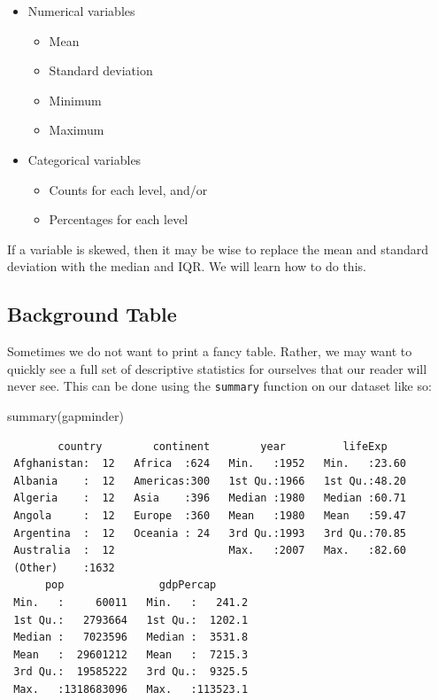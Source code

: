 \documentclass[
]{book}
\makeatletter
\newenvironment{Shaded}{\begin{snugshade}}{\end{snugshade}}
\newcommand{\FunctionTok}[1]{\textcolor[rgb]{0,0,0}{#1}}
\newcommand{\NormalTok}[1]{#1}
\providecommand{\tightlist}{%
  \setlength{\itemsep}{0pt}\setlength{\parskip}{0pt}}
\newenvironment{kframe}{%
\medskip{}
\setlength{\fboxsep}{.8em}
 \def\at@end@of@kframe{}%
 \ifinner\ifhmode%
  \def\at@end@of@kframe{\end{minipage}}%
  \begin{minipage}{\columnwidth}%
 \fi\fi%
 \def\FrameCommand##1{\hskip\@totalleftmargin \hskip-\fboxsep
 \colorbox{shadecolor}{##1}\hskip-\fboxsep
     \hskip-\linewidth \hskip-\@totalleftmargin \hskip\columnwidth}%
 \MakeFramed {\advance\hsize-\width
   \@totalleftmargin\z@ \linewidth\hsize
   \@setminipage}}%
 {\par\unskip\endMakeFramed%
 \at@end@of@kframe}
\renewenvironment{Shaded}{\begin{kframe}}{\end{kframe}}
\makeatother
\begin{document}
\begin{itemize}
\tightlist
\item
  Numerical variables

  \begin{itemize}
  \tightlist
  \item
    Mean
  \item
    Standard deviation
  \item
    Minimum
  \item
    Maximum
  \end{itemize}
\item
  Categorical variables

  \begin{itemize}
  \tightlist
  \item
    Counts for each level, and/or
  \item
    Percentages for each level
  \end{itemize}
\end{itemize}

If a variable is skewed, then it may be wise to replace the mean and standard deviation with the median and IQR. We will learn how to do this.

\hypertarget{background-table}{%
\subsection{Background Table}\label{background-table}}

Sometimes we do not want to print a fancy table. Rather, we may want to quickly see a full set of descriptive statistics for ourselves that our reader will never see. This can be done using the \texttt{summary} function on our dataset like so:

\begin{Shaded}
\begin{Highlighting}[]
\FunctionTok{summary}\NormalTok{(gapminder)}
\end{Highlighting}
\end{Shaded}

\begin{verbatim}
        country        continent        year         lifeExp     
 Afghanistan:  12   Africa  :624   Min.   :1952   Min.   :23.60  
 Albania    :  12   Americas:300   1st Qu.:1966   1st Qu.:48.20  
 Algeria    :  12   Asia    :396   Median :1980   Median :60.71  
 Angola     :  12   Europe  :360   Mean   :1980   Mean   :59.47  
 Argentina  :  12   Oceania : 24   3rd Qu.:1993   3rd Qu.:70.85  
 Australia  :  12                  Max.   :2007   Max.   :82.60  
 (Other)    :1632                                                
      pop               gdpPercap       
 Min.   :     60011   Min.   :   241.2  
 1st Qu.:   2793664   1st Qu.:  1202.1  
 Median :   7023596   Median :  3531.8  
 Mean   :  29601212   Mean   :  7215.3  
 3rd Qu.:  19585222   3rd Qu.:  9325.5  
 Max.   :1318683096   Max.   :113523.1  
                                        
\end{verbatim}
\end{document}
